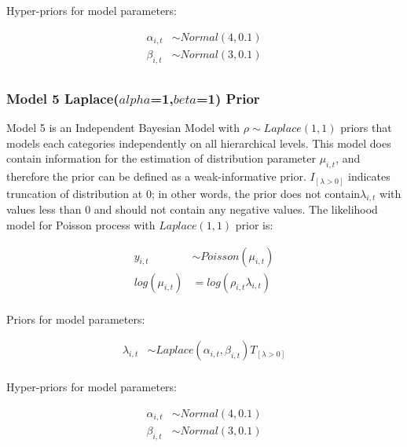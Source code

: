 Hyper-priors for model parameters:

\begin{equation*} \label{Poissonm4c}
\begin{aligned}
\alpha_{i,t} & \sim Normal(4,0.1)\\
\beta_{i,t} &\sim Normal(3,0.1)\\
\end{aligned}
\end{equation*}

\subsubsection{Model 5 Laplace($alpha$=1,$beta$=1) Prior}

Model 5 is an Independent Bayesian Model with $\rho \sim Laplace(1, 1)$ priors that models each categories independently on all hierarchical levels. This model does contain information for the estimation of distribution parameter $\mu_{i,t}$, and therefore the prior can be defined as a weak-informative prior. $I_{[\lambda>0]}$ indicates truncation of distribution at 0; in other words, the prior does not contain$\lambda_{i,t}$ with values less than 0 and should not contain any negative values. The likelihood model for Poisson process with $Laplace(1, 1)$ prior is:

\begin{equation*} \label{Poissonm5a}
\begin{aligned}
y_{i,t} & \sim Poisson(\mu_{i,t}) \\  
log(\mu_{i,t}) & = log(\rho_{i,t}\lambda_{i,t}) \\
\end{aligned}
\end{equation*}

Priors for model parameters:

\begin{equation*} \label{Poissonm5b}
\begin{aligned}
\lambda_{i,t} & \sim Laplace(\alpha_{i,t},\beta_{i,t}) T_{[\lambda>0]}\\
\end{aligned}
\end{equation*}

Hyper-priors for model parameters:

\begin{equation*} \label{Poissonm5c}
\begin{aligned}
\alpha_{i,t} & \sim Normal(4,0.1)\\
\beta_{i,t} &\sim Normal(3,0.1)\\
\end{aligned}
\end{equation*}

